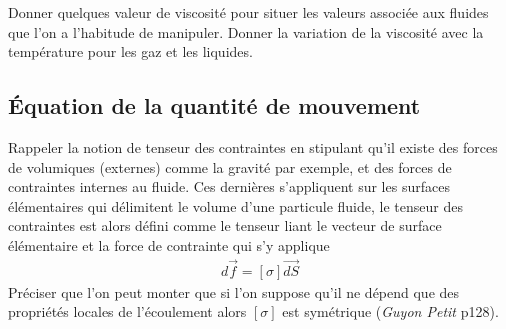 \documentclass[12pt,prb,aps,epsf]{article}
\begin{document}
Donner quelques valeur de viscosité pour situer les valeurs associée aux fluides que l'on a l'habitude de manipuler. Donner la variation de la viscosité avec la température pour les gaz et les liquides.

\subsection{Équation de la quantité de mouvement}
Rappeler la notion de tenseur des contraintes en stipulant qu'il existe des forces de volumiques (externes) comme la gravité par exemple, et des forces de contraintes internes au fluide. Ces dernières s'appliquent sur les surfaces élémentaires qui délimitent le volume d'une particule fluide, le tenseur des contraintes est alors défini comme le tenseur liant le vecteur de surface élémentaire et la force de contrainte qui s'y applique 
\begin{eqnarray}
d\vec{f} = [\sigma]\vec{dS}
\end{eqnarray}
Préciser que l'on peut monter que si l'on suppose qu'il ne dépend que des propriétés locales de l'écoulement alors $[\sigma]$ est symétrique (\textit{Guyon Petit} p128).\\
\end{document}
